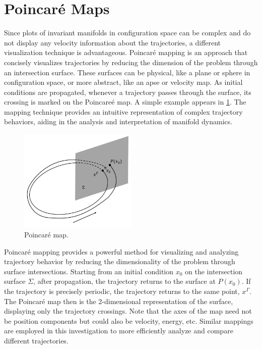 \section{Poincar\'e Maps}\label{sec:PoincareMaps}
Since plots of invariant manifolds in configuration space can be complex and do not display any
velocity information about the trajectories, a different visualization technique is advantageous.
Poincar\'e mapping is an approach that concisely visualizes trajectories by reducing the dimension
of the problem through an intersection surface. These surfaces can be physical, like a plane or
sphere in configuration space, or more abstract, like an apse or velocity map. As initial
conditions are propagated, whenever a trajectory passes through the surface, its crossing is
marked on the Poincare\'e map. A simple example appears in \cref{fig:map}. The mapping technique
provides an intuitive representation of complex trajectory behaviors, aiding in the analysis and
interpretation of manifold dynamics.

\begin{figure}[H]
    \centering
    \includegraphics[width=0.5\textwidth]{figures/Map.jpg}
    \caption{Poincar\'e map.}
    \label{fig:map}
\end{figure}

Poincaré mapping provides a powerful method for visualizing and analyzing trajectory behavior by
reducing the dimensionality of the problem through surface intersections. Starting from an initial
condition $x_{0}$ on the intersection surface $\Sigma$, after propagation, the trajectory returns
to the surface at $P(x_{0})$. If the trajectory is precisely periodic, the trajectory returns to
the same point, $x^{\Gamma}$. The Poincar\'e map then is the 2-dimensional representation of the
surface, displaying only the trajectory crossings. Note that the axes of the map need not be
position components but could also be velocity, energy, etc. Similar mappings are employed in this
investigation to more efficiently analyze and compare different trajectories.
